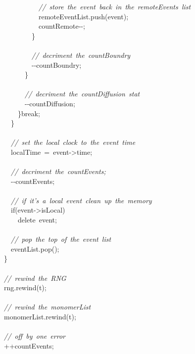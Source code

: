 {\ \ \ \ \ \ \ \ \ \ \ \ \textsl{//\ store\ the\ event\ back\ in\ the\ remoteEvents\ list}\\
\ \ \ \ \ \ \ \ \ \ \ \ remoteEventList.push(event);\\
\ \ \ \ \ \ \ \ \ \ \ \ countRemote-{}-{};\\
\ \ \ \ \ \ \ \ \ \ \}\\
\ \\
\ \ \ \ \ \ \ \ \ \ \textsl{//\ decriment\ the\ countBoundry}\\
\ \ \ \ \ \ \ \ \ \ -{}-{}countBoundry;\\
\ \ \ \ \ \ \ \ \}\\
\ \\
\ \ \ \ \ \ \ \ \textsl{//\ decriment\ the\ countDiffusion\ stat}\\
\ \ \ \ \ \ \ \ -{}-{}countDiffusion;\\
\ \ \ \ \ \ \}break;\\
\ \ \ \ \}\\
\ \\
\ \ \ \ \textsl{//\ set\ the\ local\ clock\ to\ the\ event\ time}\\
\ \ \ \ localTime\ =\ event-{}>{}time;\\
\ \\
\ \ \ \ \textsl{//\ decriment\ the\ countEvents;}\\
\ \ \ \ -{}-{}countEvents;\\
\ \\
\ \ \ \ \textsl{//\ if\ it's\ a\ local\ event\ clean\ up\ the\ memory}\\
\ \ \ \ if(event-{}>{}isLocal)\\
\ \ \ \ \ \ delete\ event;\\
\ \\
\ \ \ \ \textsl{//\ pop\ the\ top\ of\ the\ event\ list}\\
\ \ \ \ eventList.pop();\\
\ \ \}\\
\ \\
\ \ \textsl{//\ rewind\ the\ RNG}\\
\ \ rng.rewind(t);\\
\ \\
\ \ \textsl{//\ rewind\ the\ monomerList}\\
\ \ monomerList.rewind(t);\\
\ \\
\ \ \textsl{//\ off\ by\ one\ error}\\
\ \ ++countEvents;\\
\ \\
}
